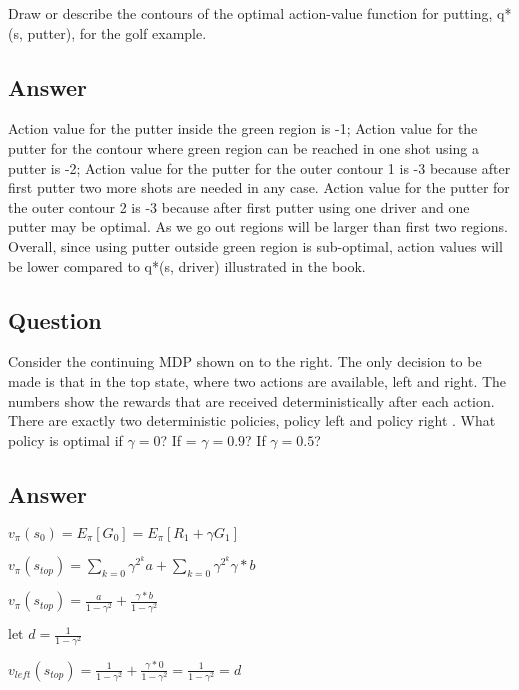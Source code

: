 \documentclass[11pt]{article}
\begin{document}
    Draw or describe the contours of the optimal action-value function for putting, q*(s, putter), for the golf example.

    \subsection*{Answer}

    Action value for the putter inside the green region is -1;
    Action value for the putter for the contour where green region can be reached in one shot using a putter is -2;
    Action value for the putter for the outer contour 1 is -3 because after first putter two more shots are needed in any case.
    Action value for the putter for the outer contour 2 is -3 because after first putter using one driver and one putter may be optimal.
    As we go out regions will be larger than first two regions.
    Overall, since using putter outside green region is sub-optimal, action values will be lower compared to q*(s, driver) illustrated in the book.

    \subsection{Question}

    Consider the continuing MDP shown on to the right.
    The only decision to be made is that in the top state, where two actions are available, left and right.
    The numbers show the rewards that are received deterministically after each action.
    There are exactly two deterministic policies, policy left and policy right .
    What policy is optimal if $\gamma = 0$? If = $\gamma = 0.9$? If $\gamma = 0.5$?

    \subsection*{Answer}

    $ v_{\pi}(s_{0}) = E_{\pi}[G_{0}] =  E_{\pi}[R_{1} + \gamma G_{1}] $

    $ v_{\pi}(s_{top}) = \sum_{k=0} \gamma^{2^{k}}a + \sum_{k=0} \gamma^{2^{k}}\gamma*b $

    $ v_{\pi}(s_{top}) = \frac{a}{1-\gamma^{2}} + \frac{\gamma * b}{1-\gamma^{2}} $

    $ \text{let } d = \frac{1}{1-\gamma^{2}} $

    $ v_{left}(s_{top}) = \frac{1}{1-\gamma^{2}} + \frac{\gamma * 0}{1-\gamma^{2}} = \frac{1}{1-\gamma^{2}} = d $
\end{document}

